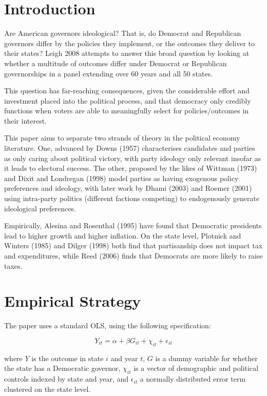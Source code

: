 \documentclass{article}
\begin{document}
\section{Introduction}

Are American governors ideological? That is, do Democrat and Republican governors differ by the policies they implement, or the outcomes they deliver to their states? Leigh 2008 attempts to answer this broad question by looking at whether a multitude of outcomes differ under Democrat or Republican governorships in a panel extending over 60 years and all 50 states. 

This question has far-reaching consequences, given the considerable effort and investment placed into the political process, and that democracy only credibly functions when voters are able to meaningfully select for policies/outcomes in their interest.

This paper aims to separate two strands of theory in the political economy literature. One, advanced by Downs (1957) characterises candidates and parties as only caring about political victory, with party ideology only relevant insofar as it leads to electoral success. The other, proposed by the likes of Wittman (1973) and Dixit and Londregan (1998) model parties as having exogenous policy preferences and ideology, with later work by Dhami (2003) and Roemer (2001) using intra-party politics (different factions competing) to endogenously generate ideological preferences.

Empirically, Alesina and Rosenthal (1995) have found that Democratic presidents lead to higher growth and higher inflation. On the state level, Plotnick and Winters (1985) and Dilger (1998) both find that partisanship does not impact tax and expenditures, while Reed (2006) finds that Democrats are more likely to raise taxes.


\section{Empirical Strategy}

The paper uses a standard OLS, using the following specification:

\[ Y_{it} = \alpha + \beta G_{it} + \chi_{it} + \epsilon_{it} \]

where $Y$ is the outcome in state $i$ and year $t$, $G$ is a dummy variable for whether the state has a Democratic governor, $\chi_{it}$ is a vector of demographic and political controls indexed by state and year, and $\epsilon_{it}$ a normally distributed error term clustered on the state level.
\end{document}
